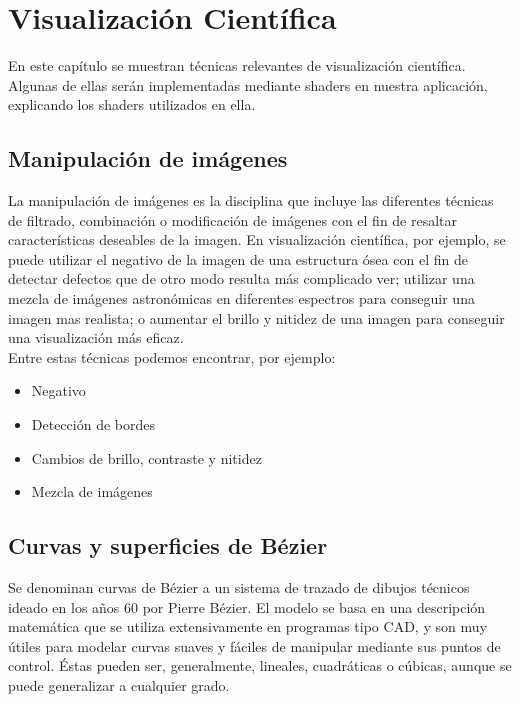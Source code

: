 \cleardoublepage

\chapter{Visualización Científica}
\label{makereference4}

En este capítulo se muestran técnicas relevantes de visualización científica.
Algunas de ellas serán implementadas mediante shaders en nuestra aplicación,
explicando los shaders utilizados en ella.

\section{Manipulación de imágenes}
\label{ref:images}


La manipulación de imágenes es la disciplina que incluye las diferentes técnicas
de filtrado, combinación o modificación de imágenes con el fin de resaltar
características deseables de la imagen. En visualización científica, por
ejemplo, se puede utilizar el negativo de la imagen de una estructura ósea con
el fin de detectar defectos que de otro modo resulta más complicado ver;
utilizar una mezcla de imágenes astronómicas en diferentes espectros para
conseguir una imagen mas realista; o aumentar el brillo y nitidez de una imagen
para conseguir una visualización más eficaz. \\

Entre estas técnicas podemos encontrar, por ejemplo:

\begin{itemize}
		\item Negativo
		\item Detección de bordes
		\item Cambios de brillo, contraste y nitidez
		\item Mezcla de imágenes
\end{itemize}

\section{Curvas y superficies de Bézier}
\label{ref:bezier}

Se denominan curvas de Bézier a un sistema de trazado de dibujos técnicos ideado
en los años 60 por Pierre Bézier. El modelo se basa en una descripción
matemática que se utiliza extensivamente en programas tipo CAD, y son muy útiles
para modelar curvas suaves y fáciles de manipular mediante sus puntos de
control. Éstas pueden ser, generalmente, lineales, cuadráticas o cúbicas, aunque
se puede generalizar a cualquier grado. \\

